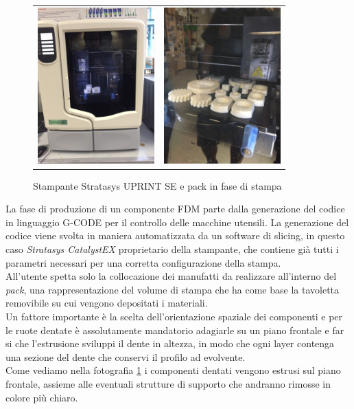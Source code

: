 \documentclass[%
corpo=11pt,
twoside,
 stile=classica,
oldstyle,
greek,%
]{toptesi}
\begin{document}
	\begin{figure}
		\centering
		\begin{tabular}{ll}
		\includegraphics[height=6cm,keepaspectratio]{image/uprint.jpg}
		&
		\includegraphics[height=6cm,keepaspectratio]{image/uprintp.jpg}
		\end{tabular}	
	\caption{Stampante Stratasys UPRINT SE e pack in fase di stampa}
	\label{fig:uprint}
	\end{figure}	
	La fase di produzione di un componente FDM parte dalla generazione del codice in linguaggio G-CODE per il controllo delle macchine utensili. 
	La generazione del codice viene svolta in maniera automatizzata da un software di slicing, in questo caso \textit{Stratasys CatalystEX}  proprietario della stampante, che contiene già tutti i parametri necessari per una corretta configurazione della stampa. \\
	All'utente spetta solo la collocazione dei manufatti da realizzare all'interno del \textit{pack}, una rappresentazione del volume di stampa che ha come base la tavoletta removibile su cui vengono depositati i materiali.\\
	 Un fattore importante è la scelta dell'orientazione spaziale dei componenti e per le ruote dentate è assolutamente mandatorio adagiarle su un piano frontale e far si che l'estrusione sviluppi il dente in altezza, in modo che ogni layer contenga una sezione del dente che conservi il profilo ad evolvente.\\ Come vediamo nella fotografia \ref{fig:uprint} i componenti dentati vengono estrusi sul piano frontale, assieme alle eventuali strutture di supporto che andranno rimosse in colore più chiaro. \\
\end{document}
